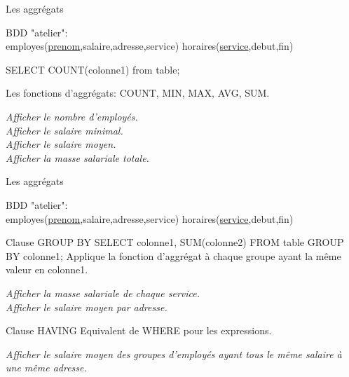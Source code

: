 \documentclass[xetex,dvipsnames]{beamer}
\begin{document}
\begin{frame}[t]{Les aggrégats}
\begin{small}
		BDD "atelier": \\employes(\underline{prenom},salaire,adresse,service) horaires(\underline{service},debut,fin)
\end{small}	
	\begin{alertblock}{}
	SELECT COUNT(colonne1) from table;
	\end{alertblock}
	\begin{block}{Les fonctions d'aggrégats:}
		COUNT, MIN, MAX, AVG, SUM.	
	\end{block}

	\textit{Afficher le nombre d'employés.}\\
	\textit{Afficher le salaire minimal.}\\
	\textit{Afficher le salaire moyen.}\\
	\textit{Afficher la masse salariale totale.}\\

\end{frame}

\begin{frame}[t]{Les aggrégats}
\begin{small}
		BDD "atelier": \\employes(\underline{prenom},salaire,adresse,service) horaires(\underline{service},debut,fin)
\end{small}	
	\begin{alertblock}{Clause GROUP BY}
	SELECT colonne1, SUM(colonne2) FROM table GROUP BY colonne1;
	Applique la fonction d'aggrégat à chaque groupe ayant la même valeur en colonne1.
	\end{alertblock}
	\textit{Afficher la masse salariale de chaque service.}\\
	\textit{Afficher le salaire moyen par adresse.}\\
	
	\begin{alertblock}{Clause HAVING}
	Equivalent de WHERE pour les expressions.
	\end{alertblock}
	\textit{Afficher le salaire moyen des groupes d'employés ayant tous le même salaire à une même adresse.}\\
\end{frame}
\end{document}
